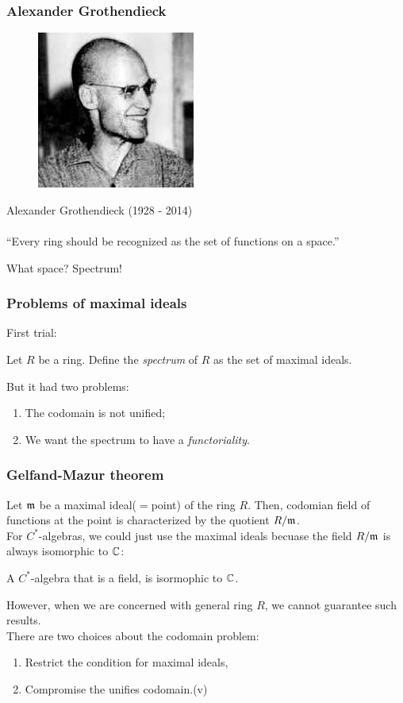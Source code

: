 \documentclass[10pt,handout]{beamer}
\begin{document}
\begin{frame}
\frametitle{Alexander Grothendieck}
  \begin{figure}\includegraphics[scale=.4]{grothendieck.jpeg}\end{figure}
  \begin{center}
  Alexander Grothendieck (1928 - 2014)\\
  \\
  ``Every ring should be recognized as the set of functions on a space.''\\
  \end{center}
  \pause What space? \pause Spectrum!
\end{frame}

\begin{frame}
\frametitle{Problems of maximal ideals}
  First trial:
  \begin{defn}
    Let $R$ be a ring.
    Define the \emph{spectrum} of $R$ as the set of maximal ideals.
  \end{defn}
  \bigskip
  \pause But it had two problems:
  \begin{enumerate}
    \item The codomain is not unified;
    \item We want the spectrum to have a \emph{functoriality}.
  \end{enumerate}
\end{frame}

\begin{frame}
\frametitle{Gelfand-Mazur theorem}
  Let $\mathfrak{m}$ be a maximal ideal($=$point) of the ring $R$.
  Then, codomian field of functions at the point is characterized by the quotient $R/\mathfrak{m}$.\\
  \pause For $C^*$-algebras, we could just use the maximal ideals becuase the field $R/\mathfrak{m}$ is always isomorphic to $\mathbb{C}$:
  \begin{thm}
    A $C^*$-algebra that is a field, is isormophic to $\mathbb{C}$.
  \end{thm}
  \pause However, when we are concerned with general ring $R$, we cannot guarantee such results.\\
  There are two choices about the codomain problem:\pause
  \begin{enumerate}
    \item Restrict the condition for maximal ideals,
    \item Compromise the unifies codomain.\pause (v)
  \end{enumerate}
\end{frame}
\end{document}
